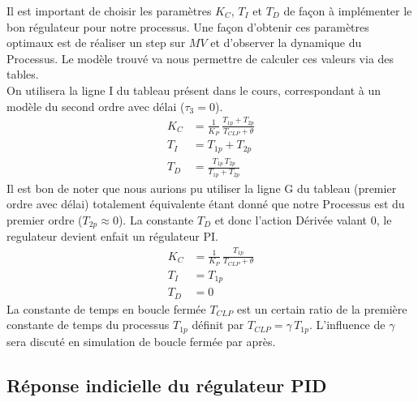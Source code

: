 Il est important de choisir les paramètres $K_C$, $T_I$ et $T_D$ de façon à implémenter le bon régulateur pour notre processus.
Une façon d'obtenir ces paramètres optimaux est de réaliser un step sur $MV$ et d'observer la dynamique du Processus.
Le modèle trouvé va nous permettre de calculer ces valeurs via des tables.\\
On utilisera la ligne I du tableau présent dans le cours, correspondant à un modèle du second ordre avec délai ($\tau_3 = 0$).
\begin{align*}
    K_C &= \frac{1}{K_P} \, \frac{T_{1p} + T_{2p}}{T_{CLP} + \theta}\\[4pt]
    T_I &= T_{1p} + T_{2p}\\[4pt]
    T_D &= \frac{T_{1p} \, T_{2p}}{T_{1p} + T_{2p}}
\end{align*}
Il est bon de noter que nous aurions pu utiliser la ligne G du tableau (premier ordre avec délai) totalement équivalente étant donné que notre Processus est du premier ordre ($T_{2p} \approx 0$).
La constante $T_D$ et donc l'action Dérivée valant 0, le regulateur devient enfait un régulateur PI.
\begin{align*}
    K_C &= \frac{1}{K_P} \, \frac{T_{1p}}{T_{CLP} + \theta}\\[4pt]
    T_I &= T_{1p}\\[4pt]
    T_D &= 0
\end{align*}
La constante de temps en boucle fermée $T_{CLP}$ est un certain ratio de la première constante de temps du processus $T_{1p}$ définit par $T_{CLP} = \gamma \, T_{1p}$. L'influence de $\gamma$ sera discuté en simulation de boucle fermée par après.

\subsection{Réponse indicielle du régulateur PID}


